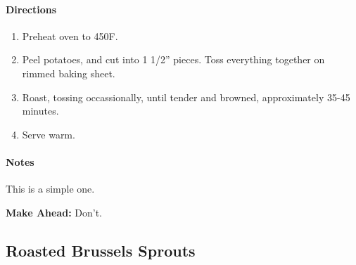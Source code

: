 \documentclass[12pt]{article}
\newenvironment*{ingredients}
	{
		\paragraph*{Ingredients}
		\begin{itemize}
	}
	{
		\end{itemize}
	}
\newenvironment*{directions}
	{
		\paragraph*{Directions}
		\begin{enumerate}
	}
	{
		\end{enumerate}
	}
\newenvironment*{notes}
	{
		\paragraph*{Notes}
		\begin{adjustwidth}{1cm}{}
	}
	{
		\end{adjustwidth}
	}
\begin{document}
	\begin{directions}
		\item Preheat oven to 450F.
		\item Peel potatoes, and cut into 1 1/2” pieces. Toss everything together on rimmed baking sheet.
		\item Roast, tossing occassionally, until tender and browned, approximately 35-45 minutes.
		\item Serve warm.
	\end{directions}
	
	\begin{notes}
		This is a simple one.
		
		\textbf{Make Ahead:} Don't.
	\end{notes}
	
	\newpage
	
	\subsection{Roasted Brussels Sprouts}
%	
%	
%	
%	
\end{document}
